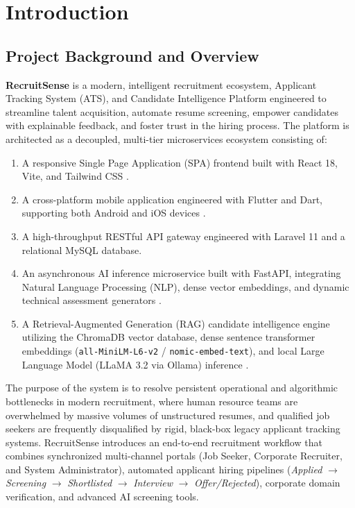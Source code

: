 \chapter{Introduction} \label{chap:intro}

\section{Project Background and Overview}
\textbf{RecruitSense} is a modern, intelligent recruitment ecosystem, Applicant Tracking System (ATS), and Candidate Intelligence Platform engineered to streamline talent acquisition, automate resume screening, empower candidates with explainable feedback, and foster trust in the hiring process. The platform is architected as a decoupled, multi-tier microservices ecosystem consisting of:
\begin{enumerate}
    \item A responsive Single Page Application (SPA) frontend built with React 18, Vite, and Tailwind CSS \cite{fielding2000rest}.
    \item A cross-platform mobile application engineered with Flutter and Dart, supporting both Android and iOS devices \cite{flutter2022google}.
    \item A high-throughput RESTful API gateway engineered with Laravel 11 and a relational MySQL database.
    \item An asynchronous AI inference microservice built with FastAPI, integrating Natural Language Processing (NLP), dense vector embeddings, and dynamic technical assessment generators \cite{ramirez2019fastapi, roy2020resume}.
    \item A Retrieval-Augmented Generation (RAG) candidate intelligence engine utilizing the ChromaDB vector database, dense sentence transformer embeddings (\texttt{all-MiniLM-L6-v2} / \texttt{nomic-embed-text}), and local Large Language Model (LLaMA 3.2 via Ollama) inference \cite{lewis2020rag, reimers2019sentence, malkov2018hnsw}.
\end{enumerate}

The purpose of the system is to resolve persistent operational and algorithmic bottlenecks in modern recruitment, where human resource teams are overwhelmed by massive volumes of unstructured resumes, and qualified job seekers are frequently disqualified by rigid, black-box legacy applicant tracking systems. RecruitSense introduces an end-to-end recruitment workflow that combines synchronized multi-channel portals (Job Seeker, Corporate Recruiter, and System Administrator), automated applicant hiring pipelines (\textit{Applied} $\rightarrow$ \textit{Screening} $\rightarrow$ \textit{Shortlisted} $\rightarrow$ \textit{Interview} $\rightarrow$ \textit{Offer/Rejected}), corporate domain verification, and advanced AI screening tools. 

